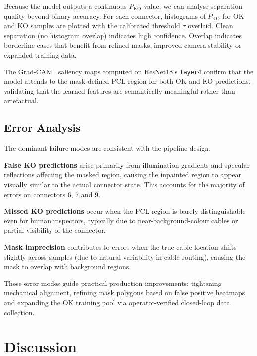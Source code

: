 \documentclass[11pt,a4paper,draft]{article}
\begin{document}
Because the model outputs a continuous $P_{\mathrm{KO}}$ value, we can analyse separation quality beyond binary accuracy. For each connector, histograms of $P_{\mathrm{KO}}$ for OK and KO samples are plotted with the calibrated threshold $\tau$ overlaid. Clean separation (no histogram overlap) indicates high confidence. Overlap indicates borderline cases that benefit from refined masks, improved camera stability or expanded training data.

The Grad-CAM~\cite{selvaraju2017gradcam} saliency maps computed on ResNet18's \texttt{layer4} confirm that the model attends to the mask-defined PCL region for both OK and KO predictions, validating that the learned features are semantically meaningful rather than artefactual.

\subsection{Error Analysis}

The dominant failure modes are consistent with the pipeline design.

\textbf{False KO predictions} arise primarily from illumination gradients and specular reflections affecting the masked region, causing the inpainted region to appear visually similar to the actual connector state. This accounts for the majority of errors on connectors 6, 7 and 9.

\textbf{Missed KO predictions} occur when the PCL region is barely distinguishable even for human inspectors, typically due to near-background-colour cables or partial visibility of the connector.

\textbf{Mask imprecision} contributes to errors when the true cable location shifts slightly across samples (due to natural variability in cable routing), causing the mask to overlap with background regions.

These error modes guide practical production improvements: tightening mechanical alignment, refining mask polygons based on false positive heatmaps and expanding the OK training pool via operator-verified closed-loop data collection.


\section{Discussion}
\end{document}
